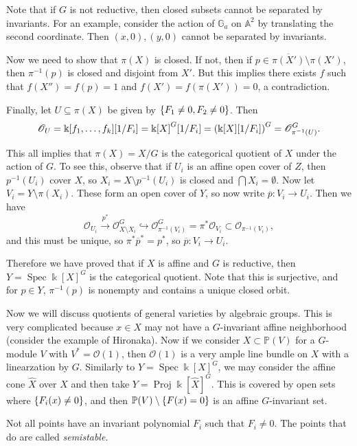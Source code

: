 \documentclass[leqno, openany]{memoir}
\theoremstyle{definition}
\theoremstyle{remark}
\theoremstyle{plain}
\theoremstyle{definition}
\theoremstyle{remark}
\newcommand{\A}{\mathbb{A}}
\renewcommand{\k}{\Bbbk}
\renewcommand{\P}{\mathbb{P}}
\newcommand{\ol}[1]{\overline{#1}}
\newcommand{\wh}[1]{\widehat{#1}}
\newcommand{\msc}[1]{\mathscr{#1}}
\DeclareMathOperator{\Spec}{Spec}
\DeclareMathOperator{\Proj}{Proj}
\begin{document}
Note that if $G$ is not reductive, then closed subsets cannot be separated by invariants. For an example, consider the action of $\mathbb{G}_a$ on $\A^2$ by translating the second coordinate. Then $(x,0), (y,0)$ cannot be separated by invariants.

Now we need to show that $\pi(X)$ is closed. If not, then if $p \in \ol{\pi(X')} \setminus \pi(X')$, then $\pi^{-1}(p)$ is closed and disjoint from $X'$. But this implies there exists $f$ such that $f(X'') = f(p) = 1$ and $f(X') = f(\pi(X')) = 0$, a contradiction.

Finally, let $U \subseteq \pi(X)$ be given by $\qty{F_1 \neq 0 , F_2 \neq 0}$. Then 
\[ \msc{O}_U = \k[f_1, \ldots, f_k][1/F_i] = {\k[X]}^G[1/F_i] = {\qty(\k[X][1/F_i])}^G = \msc{O}_{\pi^{-1}(U)}^G. \]

This all implies that $\pi(X) = X/G$ is the categorical quotient of $X$ under the action of $G$. To see this, observe that if $U_i$ is an affine open cover of $Z$, then $p^{-1}(U_i)$ cover $X$, so $X_i = X \setminus p^{-1}(U_i)$ is closed and $\bigcap X_i = \emptyset$. Now let $V_i = Y \setminus \pi(X_i)$. These form an open cover of $Y$, so now write $\ol{p} \colon V_i \to U_i$. Then we have 
\[ \msc{O}_{U_i} \xrightarrow{p^*} \msc{O}_{X\setminus X_i}^G \hookrightarrow \msc{O}_{\pi^{-1}(V_i)}^G = \pi^* \msc{O}_{V_i} \subset \msc{O}_{\pi^{-1}(V_i)}, \]
and this must be unique, so $\pi^* \ol{p}^* = p^*$, so $\ol{p} \colon V_i \to U_i$.

Therefore we have proved that if $X$ is affine and $G$ is reductive, then $Y = \Spec {\k[X]}^G$ is the categorical quotient. Note that this is surjective, and for $p \in Y$, $\pi^{-1}(p)$ is nonempty and contains a unique closed orbit.

Now we will discuss quotients of general varieties by algebraic groups. This is very complicated because $x \in X$ may not have a $G$-invariant affine neighborhood (consider the example of Hironaka). Now if we consider $X \subset \P(V)$ for a $G$-module $V$ with $V^* = \msc{O}(1)$, then $\msc{O}(1)$ is a very ample line bundle on $X$ with a linearzation by $G$. Similarly to $Y = \Spec {\k[X]}^G$, we may consider the affine cone $\wh{X}$ over $X$ and then take $Y = \Proj {\k[\wh{X}]}^G$. This is covered by open sets where $\qty{F_i(x) \neq 0}$, and then $\P(V) \setminus \qty{F(x) =0}$ is an affine $G$-invariant set.

Not all points have an invariant polynomial $F_i$ such that $F_i \neq 0$. The points that do are called \textit{semistable}.
\end{document}
